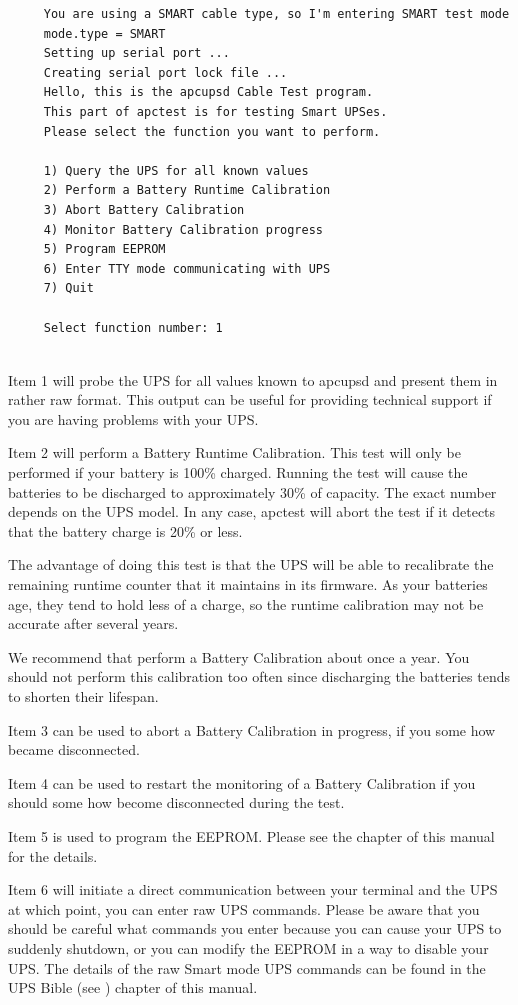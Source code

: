 {{{{\begin{verbatim}
     You are using a SMART cable type, so I'm entering SMART test mode
     mode.type = SMART
     Setting up serial port ...
     Creating serial port lock file ...
     Hello, this is the apcupsd Cable Test program.
     This part of apctest is for testing Smart UPSes.
     Please select the function you want to perform.
     
     1) Query the UPS for all known values
     2) Perform a Battery Runtime Calibration
     3) Abort Battery Calibration
     4) Monitor Battery Calibration progress
     5) Program EEPROM
     6) Enter TTY mode communicating with UPS
     7) Quit
     
     Select function number: 1
     
\end{verbatim}
\normalsize

Item 1 will probe the UPS for all values known to apcupsd and present them in
rather raw format. This output can be useful for providing technical support
if you are having problems with your UPS.  

Item 2 will perform a Battery Runtime Calibration. This test will only be
performed if your battery is 100\% charged. Running the test will cause the
batteries to be discharged to approximately 30\% of capacity. The exact number
depends on the UPS model. In any case, apctest will abort the test if it
detects that the battery charge is 20\% or less.  

The advantage of doing this test is that the UPS will be able to recalibrate
the remaining runtime counter that it maintains in its firmware. As your
batteries age, they tend to hold less of a charge, so the runtime calibration
may not be accurate after several years.  

We recommend that perform a Battery Calibration about once a year. You should
not perform this calibration too often since discharging the batteries tends
to shorten their lifespan.  

Item 3 can be used to abort a Battery Calibration in progress, if you some how
became disconnected.  

Item 4 can be used to restart the monitoring of a Battery Calibration if you
should some how become disconnected during the test.  

Item 5 is used to program the EEPROM. Please see the 
 chapter
of this manual for the details.  

Item 6 will initiate a direct communication between your terminal and the UPS
at which point, you can enter raw UPS commands. Please be aware that you
should be careful what commands you enter because you can cause your UPS to
suddenly shutdown, or you can modify the EEPROM in a way to disable your UPS.
The details of the raw Smart mode UPS commands can be found in the UPS Bible
(see 
) chapter of this
manual.  

}}}}

